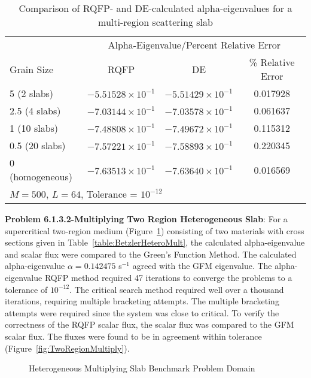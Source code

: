 \begin{table*}
\centering{}
\caption{Comparison of RQFP- and DE-calculated alpha-eigenvalues for a multi-region scattering slab}
\label{AlphaDE}
\begin{tabular}{@{}lccc@{}}\toprule
& \multicolumn{3}{c}{Alpha-Eigenvalue/Percent Relative Error} \\
\cmidrule{2-4} Grain Size & RQFP & DE & \% Relative Error \\
\midrule
5 (2 slabs) & $-5.51528 \times 10^{-1}$ & $-5.51429 \times 10^{-1}$ & 0.017928 \\ 
2.5 (4 slabs)  & $-7.03144 \times 10^{-1}$ & $-7.03578 \times 10^{-1}$ & 0.061637 \\ 
1 (10 slabs) & $-7.48808 \times 10^{-1}$ & $-7.49672 \times 10^{-1}$ & 0.115312 \\ 
0.5 (20 slabs) & $-7.57221 \times 10^{-1}$ & $-7.58893 \times 10^{-1}$ & 0.220345 \\ 
0 (homogeneous) & $-7.63513 \times 10^{-1}$ & $-7.63640 \times 10^{-1}$ & 0.016569 \\ 
\bottomrule
\multicolumn{4}{l}{$M = 500$, $L = 64$, Tolerance = $10^{-12}$} \\
\end{tabular}
\end{table*}

\clearpage
\textbf{Problem 6.1.3.2-Multiplying Two Region Heterogeneous Slab}: For a supercritical two-region medium (Figure~\ref{fig:HeteroSlabMult}) consisting of two materials with cross sections given in Table~\ref{table:BetzlerHeteroMult}, the calculated alpha-eigenvalue and scalar flux were compared to the Green's Function Method. The calculated alpha-eigenvalue $\alpha = 0.142475$ s$^{-1}$ agreed with the GFM eigenvalue. The alpha-eigenvalue RQFP method required 47 iterations to converge the problems to a tolerance of $10^{-12}$. The critical search method required well over a thousand iterations, requiring multiple bracketing attempts. The multiple bracketing attempts were required since the system was close to critical. To verify the correctness of the RQFP scalar flux, the scalar flux was compared to the GFM scalar flux. The fluxes were found to be in agreement within tolerance (Figure~\ref{fig:TwoRegionMultiply}).
\begin{figure}[h]
	\centering
	
	\caption{Heterogeneous Multiplying Slab Benchmark Problem Domain \cite{kornreich_greens_1997}}
	\label{fig:HeteroSlabMult}
\end{figure}

